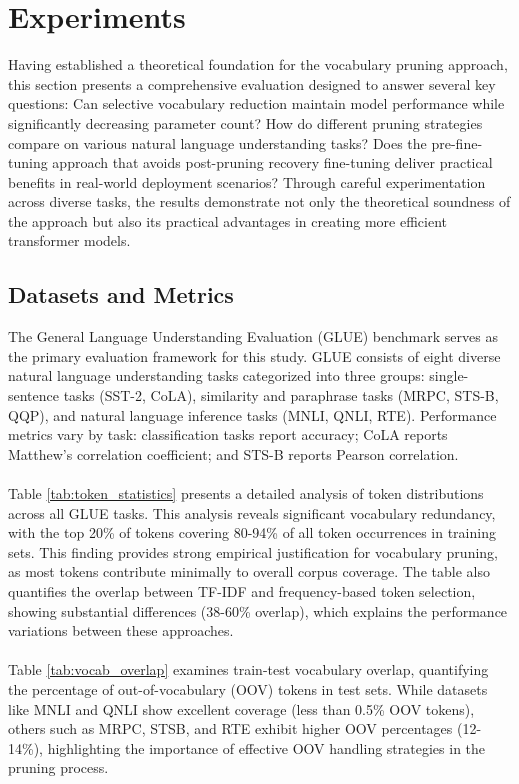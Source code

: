 \documentclass[twocolumn]{article}
\begin{document}


\section{Experiments}
Having established a theoretical foundation for the vocabulary pruning approach, this section presents a comprehensive evaluation designed to answer several key questions: Can selective vocabulary reduction maintain model performance while significantly decreasing parameter count? How do different pruning strategies compare on various natural language understanding tasks? Does the pre-fine-tuning approach that avoids post-pruning recovery fine-tuning deliver practical benefits in real-world deployment scenarios? Through careful experimentation across diverse tasks, the results demonstrate not only the theoretical soundness of the approach but also its practical advantages in creating more efficient transformer models.

\subsection{Datasets and Metrics}
The General Language Understanding Evaluation (GLUE) benchmark serves as the primary evaluation framework for this study. GLUE consists of eight diverse natural language understanding tasks categorized into three groups: single-sentence tasks (SST-2, CoLA), similarity and paraphrase tasks (MRPC, STS-B, QQP), and natural language inference tasks (MNLI, QNLI, RTE). Performance metrics vary by task: classification tasks report accuracy; CoLA reports Matthew's correlation coefficient; and STS-B reports Pearson correlation.
\\ \\
Table \ref{tab:token_statistics} presents a detailed analysis of token distributions across all GLUE tasks. This analysis reveals significant vocabulary redundancy, with the top 20\% of tokens covering 80-94\% of all token occurrences in training sets. This finding provides strong empirical justification for vocabulary pruning, as most tokens contribute minimally to overall corpus coverage. The table also quantifies the overlap between TF-IDF and frequency-based token selection, showing substantial differences (38-60\% overlap), which explains the performance variations between these approaches.
\\ \\
Table \ref{tab:vocab_overlap} examines train-test vocabulary overlap, quantifying the percentage of out-of-vocabulary (OOV) tokens in test sets. While datasets like MNLI and QNLI show excellent coverage (less than 0.5\% OOV tokens), others such as MRPC, STSB, and RTE exhibit higher OOV percentages (12-14\%), highlighting the importance of effective OOV handling strategies in the pruning process. 
\end{document}
